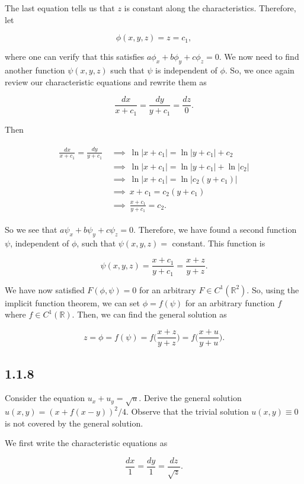 \documentclass{article}
\begin{document}
\begin{flushleft}
The last equation tells us that $z$ is constant along the characteristics. Therefore, let

$$\phi(x,y,z)=z=c_1,$$

where one can verify that this satisfies $a\phi_x+b\phi_y+c\phi_z=0$. We now need to find another function $\psi(x,y,z)$ such that $\psi$ is independent of $\phi$. So, we once again review our characteristic equations and rewrite them as

$$\frac{dx}{x+c_1}=\frac{dy}{y+c_1}=\frac{dz}{0}.$$

Then

\begin{align*}
\begin{split}
\frac{dx}{x+c_1}=\frac{dy}{y+c_1} &~\implies~ \ln{|x+c_1|}=\ln{|y+c_1|}+c_2 \\&~\implies~
\ln{|x+c_1|}=\ln{|y+c_1|}+\ln{|c_2|} \\&~\implies~
\ln{|x+c_1|}=\ln{|c_2(y+c_1)|} \\&~\implies~
x+c_1=c_2(y+c_1) \\&~\implies~
\frac{x+c_1}{y+c_1}=c_2.
\end{split}    
\end{align*}

So we see that $a\psi_x+b\psi_y+c\psi_z=0$. Therefore, we have found a second function $\psi$, independent of $\phi$, such that $\psi(x,y,z)=$ constant. This function is

$$\psi(x,y,z)=\frac{x+c_1}{y+c_1}=\frac{x+z}{y+z}.$$

We have now satisfied $F(\phi,\psi)=0$ for an arbitrary $F\in C^1(\mathbb R^2)$. So, using the implicit function theorem, we can set $\phi=f(\psi)$ for an arbitrary function $f$ where $f\in C^1(\mathbb R)$. Then, we can find the general solution as

$$z=\phi=f(\psi)=f\bigg(\frac{x+z}{y+z}\bigg)=f\bigg(\frac{x+u}{y+u}\bigg).$$

\subsection{\textbf{1.1.8}} Consider the equation $u_x + u_y = \sqrt{u}$. Derive the general solution $u(x,y)=(x+f(x-y))^2/4$. Observe that the trivial solution $u(x,y)\equiv 0$ is not covered by the general solution.

We first write the characteristic equations as

$$\frac{dx}{1}=\frac{dy}{1}=\frac{dz}{\sqrt{z}}. $$


\end{flushleft}
\end{document}
